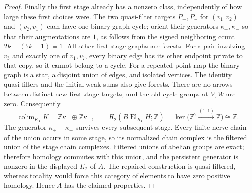 \begin{proof}
Finally the first stage already has a nonzero class, independently
of how large these first choices were. The two quasi-filter targets
$P_+,P_-$ for $(v_1,v_2)$ and $(v_2,v_1)$ each have one binary graph
cycle; orient their generators $\kappa_+,\kappa_-$ so that their
augmentations are $1$, as follows from the signed neighboring count
$2k-(2k-1)=1$. All other first-stage graphs are forests. For a pair
involving $v_3$ and exactly one of $v_1,v_2$, every binary edge has
its other endpoint private to that copy, so it cannot belong to a
cycle. For a repeated point map the binary graph is a star, a
disjoint union of edges, and isolated vertices. The identity
quasi-filters and the initial weak sums also give forests.
There are no arrows between distinct new first-stage targets, and
the old cycle groups at $V,W$ are zero. Consequently
\[
 \operatorname{colim}_{K_1}K=\mathbb Z\kappa_+
                   \oplus\mathbb Z\kappa_-,
 \qquad
 H_2(B\operatorname{El}_{K_1}H;\mathbb Z)
       =\ker\bigl(\mathbb Z^2\xrightarrow{(1,1)}\mathbb Z\bigr)
       \cong\mathbb Z.
\]
The generator $\kappa_+-\kappa_-$ survives every subsequent stage.
Every finite nerve chain of the union occurs in some stage, so its
normalized chain complex is the filtered union of the stage chain
complexes. Filtered unions of abelian groups are exact; therefore
homology commutes with this union, and the persistent generator
is nonzero in the displayed $H_2$ of $A$. The repaired construction
is quasi-filtered, whereas totality would force this category of
elements to have zero positive homology. Hence $A$ has the claimed
properties.
\end{proof}
